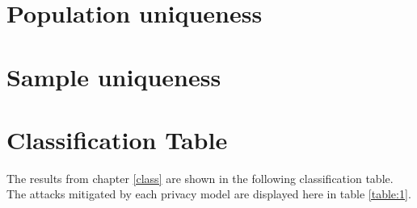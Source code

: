 \documentclass[12pt, a4paper,oneside]{report}
\begin{document}
\section{Population uniqueness}

\section{Sample uniqueness}

\section{Classification Table}

The results from chapter \ref{class} are shown in the following classification table. The attacks mitigated by each privacy model are displayed here in table \ref{table:1}.
\newpage
\end{document}
